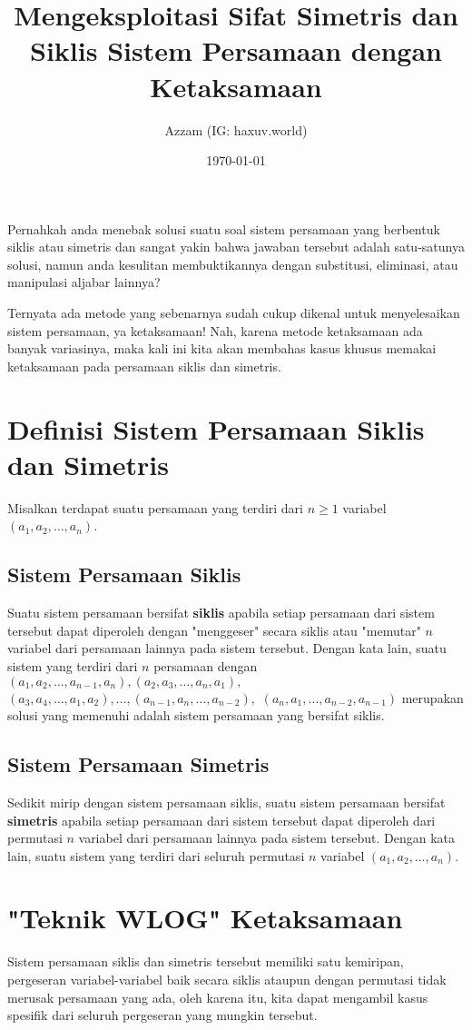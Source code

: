\documentclass[11pt]{scrartcl}
\title{Mengeksploitasi Sifat Simetris dan Siklis Sistem Persamaan dengan Ketaksamaan}
\author{Azzam (IG: haxuv.world)}
\date{\today}
\begin{document}
\maketitle

Pernahkah anda menebak solusi suatu soal sistem persamaan yang berbentuk siklis atau simetris dan sangat yakin bahwa jawaban tersebut adalah satu-satunya solusi, namun anda kesulitan membuktikannya dengan substitusi, eliminasi, atau manipulasi aljabar lainnya?

Ternyata ada metode yang sebenarnya sudah cukup dikenal untuk menyelesaikan sistem persamaan, ya ketaksamaan! Nah, karena metode ketaksamaan ada banyak variasinya, maka kali ini kita akan membahas kasus khusus memakai ketaksamaan pada persamaan siklis dan simetris.


\section{Definisi Sistem Persamaan Siklis dan Simetris}
Misalkan terdapat suatu persamaan yang terdiri dari $n \ge 1$ variabel $(a_1, a_2, \dots, a_n)$.

\subsection{Sistem Persamaan Siklis}
Suatu sistem persamaan bersifat \textbf{siklis} apabila setiap persamaan dari sistem tersebut dapat diperoleh dengan "menggeser" secara siklis atau "memutar" $n$ variabel dari persamaan lainnya pada sistem tersebut. Dengan kata lain, suatu sistem yang terdiri dari $n$ persamaan dengan $(a_1, a_2, \dots,a_{n-1}, a_n), (a_2, a_3, \dots, a_n, a_1),$
$ (a_3, a_4, \dots, a_1, a_2), \dots,(a_{n-1}, a_{n}, \dots, a_{n-2}),$
$(a_n, a_1, \dots, a_{n-2}, a_{n-1})$ merupakan solusi yang memenuhi adalah sistem persamaan yang bersifat siklis.
\vspace{2mm}
\subsection{Sistem Persamaan Simetris}
Sedikit mirip dengan sistem persamaan siklis, suatu sistem persamaan bersifat \textbf{simetris} apabila setiap persamaan dari sistem tersebut dapat diperoleh dari permutasi $n$ variabel dari persamaan lainnya pada sistem tersebut. Dengan kata lain, suatu sistem yang terdiri dari seluruh permutasi $n$ variabel $(a_1, a_2, \dots, a_n)$.


\section{"Teknik WLOG" Ketaksamaan}
Sistem persamaan siklis dan simetris tersebut memiliki satu kemiripan, pergeseran variabel-variabel baik secara siklis ataupun dengan permutasi tidak merusak persamaan yang ada, oleh karena itu, kita dapat mengambil kasus spesifik dari seluruh pergeseran yang mungkin tersebut.
\end{document}
